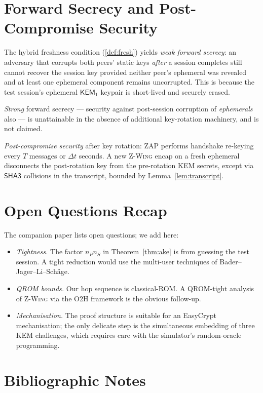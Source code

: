 \documentclass[11pt,a4paper]{article}
\theoremstyle{definition}
\theoremstyle{remark}
\newcommand{\KEM}{\ensuremath{\mathsf{KEM}}}
\newcommand{\zwing}{\textsc{Z-Wing}}
\newcommand{\zap}{\textsc{ZAP}}
\newcommand{\sha}{\ensuremath{\mathsf{SHA3}}}
\begin{document}
\section{Forward Secrecy and Post-Compromise Security}\label{sec:fs}

The hybrid freshness condition (\cref{def:fresh}) yields
\emph{weak forward secrecy}: an adversary that corrupts both peers' static
keys \emph{after} a session completes still cannot recover the session key
provided neither peer's ephemeral was revealed and at least one ephemeral
component remains uncorrupted. This is because the test session's ephemeral
$\KEM_1$ keypair is short-lived and securely erased.

\emph{Strong} forward secrecy --- security against post-session corruption
of \emph{ephemerals} also --- is unattainable in the absence of additional
key-rotation machinery, and is not claimed.

\emph{Post-compromise security} after key rotation: \zap{} performs handshake
re-keying every $T$ messages or $\Delta t$ seconds. A new \zwing{} encap on
a fresh ephemeral disconnects the post-rotation key from the pre-rotation
KEM secrets, except via $\sha$ collisions in the transcript, bounded by
Lemma~\ref{lem:transcript}.

\section{Open Questions Recap}\label{sec:open}

The companion paper lists open questions; we add here:
\begin{itemize}
\item \emph{Tightness.} The factor $n_P n_S$ in Theorem~\ref{thm:ake} is from
guessing the test session. A tight reduction would use the multi-user
techniques of Bader--Jager--Li--Sch{\"a}ge.
\item \emph{QROM bounds.} Our hop sequence is classical-ROM. A QROM-tight
analysis of \zwing{} via the O2H framework is the obvious follow-up.
\item \emph{Mechanisation.} The proof structure is suitable for an
EasyCrypt mechanisation; the only delicate step is the simultaneous
embedding of three KEM challenges, which requires care with the simulator's
random-oracle programming.
\end{itemize}

\appendix

\section{Bibliographic Notes}\label{app:bib}
\end{document}
